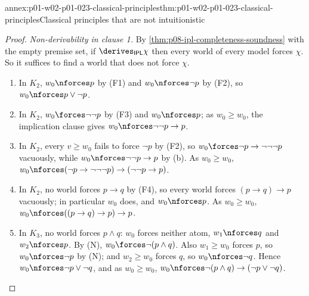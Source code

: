 \begin{annexitem}{annex:p01-w02-p01-023-classical-principles}{thm:p01-w02-p01-023-classical-principles}{Classical principles that are not intuitionistic}
\begin{proof}
\emph{Non-derivability in clause 1.} By
\cref{thm:p08-ipl-completeness-soundness} with the empty premise set, if
\(\derives_{\mathsf{IPL}}\chi\) then every world of every model forces
\(\chi\). So it suffices to find a world that does not force \(\chi\).
\begin{enumerate}
  \item[(a)] In \(K_2\), \(w_0\nforces p\) by (F1) and \(w_0\nforces\neg p\)
        by (F2), so \(w_0\nforces p\lor\neg p\).
  \item[(b)] In \(K_2\), \(w_0\forces\neg\neg p\) by (F3) and
        \(w_0\nforces p\); as \(w_0\geq w_0\), the implication clause gives
        \(w_0\nforces\neg\neg p\to p\).
  \item[(c)] In \(K_2\), every \(v\geq w_0\) fails to force \(\neg p\) by
        (F2), so \(w_0\forces\neg p\to\neg\neg\neg p\) vacuously, while
        \(w_0\nforces\neg\neg p\to p\) by (b). As \(w_0\geq w_0\),
        \(w_0\nforces(\neg p\to\neg\neg\neg p)\to(\neg\neg p\to p)\).
  \item[(d)] In \(K_2\), no world forces \(p\to q\) by (F4), so every world
        forces \((p\to q)\to p\) vacuously; in particular \(w_0\) does, and
        \(w_0\nforces p\). As \(w_0\geq w_0\),
        \(w_0\nforces((p\to q)\to p)\to p\).
  \item[(e)] In \(K_3\), no world forces \(p\land q\): \(w_0\) forces
        neither atom, \(w_1\nforces q\) and \(w_2\nforces p\). By (N),
        \(w_0\forces\neg(p\land q)\). Also \(w_1\geq w_0\) forces \(p\), so
        \(w_0\nforces\neg p\) by (N); and \(w_2\geq w_0\) forces \(q\), so
        \(w_0\nforces\neg q\). Hence \(w_0\nforces\neg p\lor\neg q\), and as
        \(w_0\geq w_0\),
        \(w_0\nforces\neg(p\land q)\to(\neg p\lor\neg q)\).
\end{enumerate}


\end{proof}
\end{annexitem}
